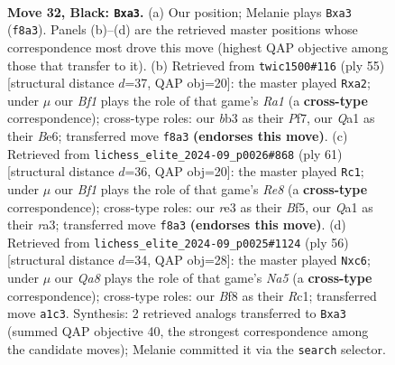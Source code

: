 \documentclass[11pt]{article}
\begin{document}
\clearpage

\begin{figure}[p]\centering
\begin{subfigure}{0.46\textwidth}\centering
\resizebox{\linewidth}{!}{%
\newchessgame
\chessboard[
  setfen={5b2/pp5p/6pk/8/8/PB2R1P1/5PKP/q7 b - - 3 32},
  showmover=false,
  pgfstyle=straightmove, color=movearrow, markmove={f8-a3}
]}
\caption{}
\end{subfigure}\hfill
\begin{subfigure}{0.46\textwidth}\centering
\resizebox{\linewidth}{!}{%
\newchessgame
\chessboard[
  setfen={r5k1/5pp1/4b3/8/3B4/6Pp/P3PP1P/5RK1 b - - 2 28},
  showmover=false,
  pgfstyle=straightmove, color=movearrow, markmove={a8-a2}
]}
\caption{}
\end{subfigure}
\\[4pt]
\begin{subfigure}{0.46\textwidth}\centering
\resizebox{\linewidth}{!}{%
\newchessgame
\chessboard[
  setfen={6k1/5pp1/7p/pB3b2/2P5/R5P1/5PPK/4r3 b - - 3 31},
  showmover=false,
  pgfstyle=straightmove, color=movearrow, markmove={e1-c1}
]}
\caption{}
\end{subfigure}\hfill
\begin{subfigure}{0.46\textwidth}\centering
\resizebox{\linewidth}{!}{%
\newchessgame
\chessboard[
  setfen={6k1/5pp1/2p1p2p/N7/b2r4/7P/P4PP1/2R3K1 w - - 0 29},
  showmover=false,
  pgfstyle=straightmove, color=movearrow, markmove={a5-c6}
]}
\caption{}
\end{subfigure}
\caption{\textbf{Move 32, Black: \texttt{Bxa3}.} (a) Our position; Melanie plays \texttt{Bxa3} (\texttt{f8a3}). Panels (b)--(d) are the retrieved master positions whose correspondence most drove this move (highest QAP objective among those that transfer to it). (b) Retrieved from \texttt{twic1500\#116} (ply 55) [structural distance $d$=37, QAP obj=20]: the master played \texttt{Rxa2}; under $\mu$ our \emph{Bf1} plays the role of that game's \emph{Ra1} (a \textbf{cross-type} correspondence); cross-type roles: our \emph{b}b3 as their \emph{P}f7, our \emph{Q}a1 as their \emph{B}e6; transferred move \texttt{f8a3} \textbf{(endorses this move)}. (c) Retrieved from \texttt{lichess\_elite\_2024-09\_p0026\#868} (ply 61) [structural distance $d$=36, QAP obj=20]: the master played \texttt{Rc1}; under $\mu$ our \emph{Bf1} plays the role of that game's \emph{Re8} (a \textbf{cross-type} correspondence); cross-type roles: our \emph{r}e3 as their \emph{B}f5, our \emph{Q}a1 as their \emph{r}a3; transferred move \texttt{f8a3} \textbf{(endorses this move)}. (d) Retrieved from \texttt{lichess\_elite\_2024-09\_p0025\#1124} (ply 56) [structural distance $d$=34, QAP obj=28]: the master played \texttt{Nxc6}; under $\mu$ our \emph{Qa8} plays the role of that game's \emph{Na5} (a \textbf{cross-type} correspondence); cross-type roles: our \emph{B}f8 as their \emph{R}c1; transferred move \texttt{a1c3}. Synthesis: 2 retrieved analogs transferred to \texttt{Bxa3} (summed QAP objective 40, the strongest correspondence among the candidate moves); Melanie committed it via the \texttt{search} selector.}
\label{fig:thought-m63}
\end{figure}
\end{document}

